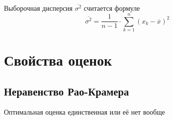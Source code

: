 \begin{definition}
    Выборочная дисперсия $\overline{\sigma^2}$
    считается формуле
    $$\overline{\sigma^2}
        =\frac{1}{n-1}\cdot\sum_{k=1}^n \left(x_k-\overline{x}\right)^2$$
\end{definition}
\section{Свойства оценок}
\subsection{Неравенство Рао-Крамера}
\begin{theorem}
    \label{theorem:Kolmogorov}
    Оптимальная оценка единственная или её нет вообще
\end{theorem}
